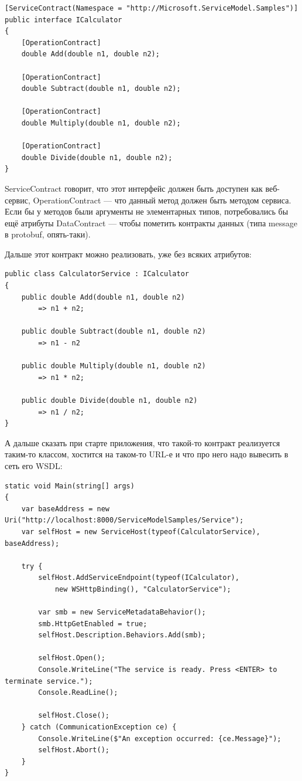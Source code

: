 \documentclass[a5paper]{article}
\begin{document}
\begin{verbatim}
[ServiceContract(Namespace = "http://Microsoft.ServiceModel.Samples")]  
public interface ICalculator  
{
    [OperationContract]
    double Add(double n1, double n2);

    [OperationContract]
    double Subtract(double n1, double n2);

    [OperationContract]
    double Multiply(double n1, double n2);

    [OperationContract]
    double Divide(double n1, double n2);
}
\end{verbatim}

ServiceContract говорит, что этот интерфейс должен быть доступен как веб-сервис, OperationContract --- что данный метод должен быть методом сервиса. Если бы у методов были аргументы не элементарных типов, потребовались бы ещё атрибуты DataContract --- чтобы пометить контракты данных (типа message в protobuf, опять-таки).

Дальше этот контракт можно реализовать, уже без всяких атрибутов:

\begin{verbatim}
public class CalculatorService : ICalculator  
{
    public double Add(double n1, double n2)
        => n1 + n2;  

    public double Subtract(double n1, double n2)
        => n1 - n2

    public double Multiply(double n1, double n2)  
        => n1 * n2;

    public double Divide(double n1, double n2)  
        => n1 / n2;
}
\end{verbatim}

А дальше сказать при старте приложения, что такой-то контракт реализуется таким-то классом, хостится на таком-то URL-е и что про него надо вывесить в сеть его WSDL:

\begin{verbatim}
static void Main(string[] args) 
{
    var baseAddress = new Uri("http://localhost:8000/ServiceModelSamples/Service");
    var selfHost = new ServiceHost(typeof(CalculatorService), baseAddress);

    try {
        selfHost.AddServiceEndpoint(typeof(ICalculator), 
            new WSHttpBinding(), "CalculatorService");

        var smb = new ServiceMetadataBehavior();
        smb.HttpGetEnabled = true;
        selfHost.Description.Behaviors.Add(smb);

        selfHost.Open();
        Console.WriteLine("The service is ready. Press <ENTER> to terminate service.");
        Console.ReadLine();

        selfHost.Close();  
    } catch (CommunicationException ce) {
        Console.WriteLine($"An exception occurred: {ce.Message}");
        selfHost.Abort();
    }
}
\end{verbatim}
\end{document}
